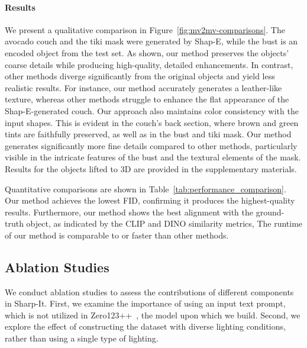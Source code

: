 \paragraph{Results}
We present a qualitative comparison in Figure~\ref{fig:mv2mv-comparisons}. The avocado couch and the tiki mask were generated by Shap-E, while the bust is an encoded object from the test set. As shown, our method preserves the objects' coarse details while producing high-quality, detailed enhancements. In contrast, other methods diverge significantly from the original objects and yield less realistic results. For instance, our method accurately generates a leather-like texture, whereas other methods struggle to enhance the flat appearance of the Shap-E-generated couch.
Our approach also maintains color consistency with the input shapes. This is evident in the couch's back section, where brown and green tints are faithfully preserved, as well as in the bust and tiki mask. Our method generates significantly more fine details compared to other methods, particularly visible in the intricate features of the bust and the textural elements of the mask. 
Results for the objects lifted to 3D are provided in the supplementary materials.

Quantitative comparisons are shown in Table~\ref{tab:performance_comparison}. Our method achieves the lowest FID, confirming it produces the highest-quality results. Furthermore, our method shows the best alignment with the ground-truth object, as indicated by the CLIP and DINO similarity metrics, The runtime of our method is comparable to or faster than other methods.



\subsection{Ablation Studies}




We conduct ablation studies to assess the contributions of different components in Sharp-It. 
First, we examine the importance of using an input text prompt, which is not utilized in Zero123++~\cite{shi2023zero123singleimageconsistent, xu2024instantmesh}, the model upon which we build.
Second, we explore the effect of constructing the dataset with diverse lighting conditions, rather than using a single type of lighting.

